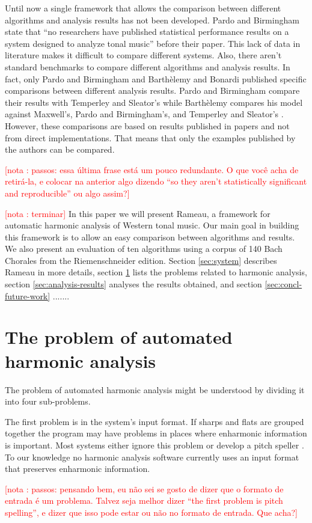 \documentclass{article}
\newcounter{notacounter}
\newcommand{\nota}[1]{
  \addtocounter{notacounter}{1}
  \textcolor{red}{[nota \arabic{notacounter}: #1]}
}
\begin{document}
Until now a single framework that allows the comparison between
different algorithms and analysis results has not been developed.
Pardo and Birmingham state that ``no researchers have published
statistical performance results on a system designed to analyze tonal
music'' \cite{pardo02:algorithms} before their paper. This lack of
data in literature makes it difficult to compare different systems.
Also, there aren't standard benchmarks to compare different algorithms
and analysis results. In fact, only Pardo and Birmingham
\cite{pardo00:automated} and Barthèlemy and Bonardi
\cite{barthelemy01:figured} published specific comparisons between
different analysis results. Pardo and Birmingham compare their results
with Temperley and Sleator's \cite{temperley99:modeling} while
Barthèlemy compares his model against Maxwell's, Pardo and
Birmingham's, and Temperley and Sleator's
\cite{maxwell92:expert,temperley96:algorithm,pardo99:automated}.
However, these comparisons are based on results published in papers
and not from direct implementations. That means that only the examples
published by the authors can be compared. \nota{passos: essa última
  frase está um pouco redundante. O que você acha de retirá-la, e
  colocar na anterior algo dizendo ``so they aren't statistically
  significant and reproducible'' ou algo assim?}

\nota{terminar} In this paper we will present Rameau, a framework for
automatic harmonic analysis of Western tonal music. Our main goal in
building this framework is to allow an easy comparison between
algorithms and results. We also present an evaluation of ten
algorithms using a corpus of 140 Bach Chorales from the
Riemenschneider edition. Section \ref{sec:system} describes Rameau in
more details, section \ref{sec:problem} lists the problems related to
harmonic analysis, section \ref{sec:analysis-results} analyses the
results obtained, and section \ref{sec:concl-future-work} .......

\section{The problem of automated harmonic analysis}
\label{sec:problem}

The problem of automated harmonic analysis might be understood by
dividing it into four sub-problems. 

The first problem is in the system's input format. If sharps and flats
are grouped together the program may have problems in places where
enharmonic information is important. Most systems either ignore this
problem or develop a pitch speller \cite{temperley99:modeling}. To our
knowledge no harmonic analysis software currently uses an input format
that preserves enharmonic information. \nota{ passos: pensando bem, eu
  não sei se gosto de dizer que o formato de entrada é um
  problema. Talvez seja melhor dizer ``the first problem is pitch
  spelling'', e dizer que isso pode estar ou não no formato de
  entrada. Que acha?}
\end{document}
